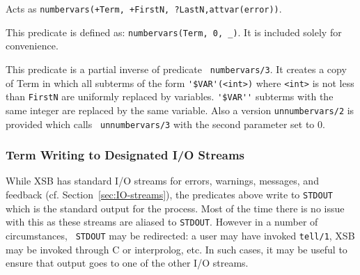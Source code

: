 \begin{description}
%
Acts as {\tt numbervars(+Term, +FirstN, ?LastN,attvar(error))}.

    This predicate is defined as: {\tt numbervars(Term, 0, \_)}.  It
    is included solely for convenience.

    This predicate is a partial inverse of predicate {\tt
    numbervars/3}.  It creates a copy of Term in which all subterms of
    the form \verb|'$VAR'(<int>)| where \verb|<int>| is not less than
    {\tt FirstN} are uniformly replaced by variables.  \verb|'$VAR''|
    subterms with the same integer are replaced by the same variable.
    Also a version {\tt unnumbervars/2} is provided which calls {\tt
    unnumbervars/3} with the second parameter set to 0.

\end{description}

\subsubsection{Term Writing to Designated I/O Streams}
%
While XSB has standard I/O streams for errors, warnings, messages, and
feedback (cf. Section~\ref{sec:IO-streams}), the predicates above
write to {\tt STDOUT} which is the standard output for the process.
Most of the time there is no issue with this as these streams are
aliased to {\tt STDOUT}.  However in a number of circumstances, {\tt
  STDOUT} may be redirected: a user may have invoked {\tt tell/1}, XSB
may be invoked through C or interprolog, etc.  In such cases, it may
be useful to ensure that output goes to one of the other I/O streams.  

